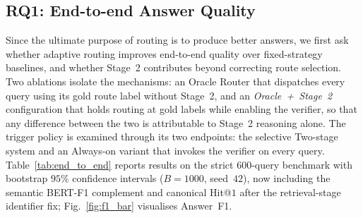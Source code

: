 \documentclass[pdflatex,sn-mathphys-num]{sn-jnl}
\begin{document}
\subsection{RQ1: End-to-end Answer Quality}\label{subsec:rq1}

Since the ultimate purpose of routing is to produce better answers, we first
ask whether adaptive routing improves end-to-end quality over fixed-strategy
baselines, and whether Stage~2 contributes beyond correcting route selection.
Two ablations isolate the mechanisms: an Oracle Router that dispatches every
query using its gold route label without Stage~2, and an
\textit{Oracle~+~Stage~2} configuration that holds routing at gold labels
while enabling the verifier, so that any difference between the two is
attributable to Stage~2 reasoning alone. The trigger policy is examined
through its two endpoints: the selective Two-stage system and an Always-on
variant that invokes the verifier on every query.
Table~\ref{tab:end_to_end} reports results on the strict $600$-query
benchmark with bootstrap $95\%$ confidence intervals ($B=1000$, seed~$42$),
now including the semantic BERT-F1 complement and canonical Hit@$1$ after the
retrieval-stage identifier fix; Fig.~\ref{fig:f1_bar} visualises Answer~F1.
\end{document}
